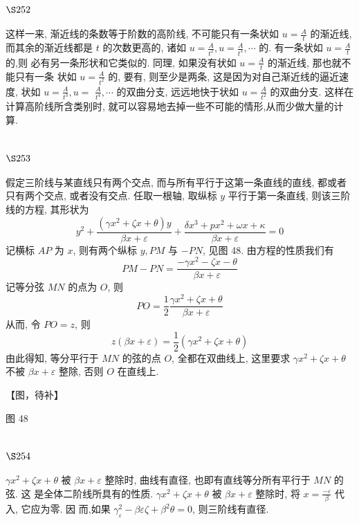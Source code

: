 \section{$\S 252$}

这样一来, 渐近线的条数等于阶数的高阶线, 不可能只有一条状如 $u=\frac{A}{t}$ 的渐近线, 而其余的渐近线都是 $t$ 的次数更高的, 诸如 $u=\frac{A}{t^{2}}, u=\frac{A}{t^{3}}, \cdots$ 的. 有一条状如 $u=\frac{A}{t}$ 的,则 必有另一条形状和它类似的. 同理, 如果没有状如 $u=\frac{A}{t}$ 的渐近线, 那也就不能只有一条 状如 $u=\frac{A}{t^{2}}$ 的, 要有, 则至少是两条, 这是因为对自己渐近线的逼近速度, 状如 $u=\frac{A}{t^{3}}, u=$ $\frac{A}{t^{4}}, \cdots$ 的双曲分支, 远远地快于状如 $u=\frac{A}{t^{2}}$ 的双曲分支. 这样在计算高阶线所含类别时, 就可以容易地去掉一些不可能的情形,从而少做大量的计算.

\section{$\S 253$}

假定三阶线与某直线只有两个交点, 而与所有平行于这第一条直线的直线, 都或者 只有两个交点, 或者没有交点. 任取一根轴, 取纵标 $y$ 平行于第一条直线, 则该三阶线的方程, 其形状为
\[
y^{2}+\frac{\left(\gamma x^{2}+\zeta x+\theta\right) y}{\beta x+\varepsilon}+\frac{\delta x^{3}+p x^{2}+\omega x+\kappa}{\beta x+\varepsilon}=0
\]
记横标 $A P$ 为 $x$, 则有两个纵标 $y, P M$ 与 $-P N$, 见图 48. 由方程的性质我们有
\[
P M-P N=\frac{-\gamma x^{2}-\zeta x-\theta}{\beta x+\varepsilon}
\]
记等分弦 $M N$ 的点为 $O$, 则
\[
P O=\frac{1}{2} \frac{\gamma x^{2}+\zeta x+\theta}{\beta x+\varepsilon}
\]
从而, 令 $P O=z$, 则
\[
z(\beta x+\varepsilon)=\frac{1}{2}\left(\gamma x^{2}+\zeta x+\theta\right)
\]
由此得知, 等分平行于 $M N$ 的弦的点 $O$, 全都在双曲线上, 这里要求 $\gamma x^{2}+\zeta x+\theta$ 不被 $\beta x+\varepsilon$ 整除, 否则 $O$ 在直线上.


【图，待补】

图 48

\section{$\S 254$}

$\gamma x^{2}+\zeta x+\theta$ 被 $\beta x+\varepsilon$ 整除时, 曲线有直径, 也即有直线等分所有平行于 $M N$ 的弦. 这 是全体二阶线所具有的性质. $\gamma x^{2}+\zeta x+\theta$ 被 $\beta x+\varepsilon$ 整除时, 将 $x=\frac{-\varepsilon}{\beta}$ 代入, 它应为零. 因 而,如果 $\gamma_{\varepsilon}^{2}-\beta \varepsilon \zeta+\beta^{2} \theta=0$, 则三阶线有直径.


